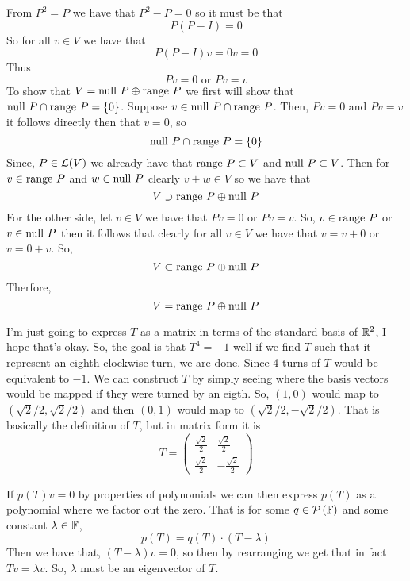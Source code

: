 \documentclass[10pt, twocolumn]{article}
\begin{document}
\begin{q}[4]
    From $ P^2 = P $ we have that $ P^2 - P = 0 $ so it must be that 
    $$ P(P - I) = 0 $$
    So for all $ v \in V $ we have that 
    $$ P(P - I)v = 0v = 0 $$
    Thus
    $$ Pv = 0 \text{ or } Pv = v $$
    To show that $ V = \text{null } P \oplus \text{range } P $ we first will show that $ \text{null } P \cap \text{range } P = \{0\} $.
    Suppose $ v \in \text{null } P \cap \text{range } P $. 
    Then, $ Pv = 0 $ and $ Pv = v $ it follows directly then that $ v = 0 $, so 
    $$ \text{null } P \cap \text{range } P = \{0\} $$
    Since, $ P \in \mathcal{L}(V) $ we already have that $ \text{range } P \subset V $ and $ \text{null } P \subset V $. 
    Then for $ v \in \text{range } P $ and $ w \in \text{null } P $ clearly $ v + w \in V $ so we have that 
    $$ V \supset \text{range } P \oplus \text{null } P $$
    For the other side, let $ v \in V $ we have that $ Pv = 0 $ or $ Pv = v $. 
    So, $ v \in \text{range } P $ or $ v \in \text{null } P $ then it follows that clearly for all $ v \in V $ we have that 
    $ v = v + 0 $ or $ v = 0 + v $. 
    So, 
    $$ V \subset \text{range } P \oplus \text{null } P $$
    Therfore,
    $$ V = \text{range } P \oplus \text{null } P $$
\end{q}
\begin{q}[8]
    I'm just going to express $ T $ as a matrix in terms of the standard basis of $ \mathbb{R}^2 $, I hope that's okay. 
    So, the goal is that $ T^4 = -1 $ well if we find $ T $ such that it represent an eighth clockwise turn, we are done. 
    Since 4 turns of $ T $ would be equivalent to $ - 1 $. 
    We can construct $ T $ by simply seeing where the basis vectors would be mapped if they were turned by an eigth. 
    So, $ (1, 0) $ would map to $ (\sqrt{2}/2, \sqrt{2}/2)$ and then $ (0, 1) $ would map to $ (\sqrt{2}/2, -\sqrt{2}/2)$. 
    That is basically the definition of $ T $, but in matrix form it is 
    $$ T = \begin{pmatrix}
        \frac{\sqrt{2}}{2} & \frac{\sqrt{2}}{2} \\
        \frac{\sqrt{2}}{2} & -\frac{\sqrt{2}}{2}
        \end{pmatrix} 
    $$
\end{q}
\begin{q}[9]
    If $ p(T)v = 0 $ by properties of polynomials we can then express $ p(T) $ as a polynomial where we factor out the zero. 
    That is for some $ q \in \mathcal{P}_{}\left(\mathbb{F}\right) $ and some constant $ \lambda \in \mathbb{F} $, 
    $$ p(T) = q(T) \cdot (T - \lambda) $$
    Then we have that, 
    $ (T - \lambda) v = 0 $, so then by rearranging we get that in fact $ Tv = \lambda v $. 
    So, $ \lambda $ must be an eigenvector of $ T $.
\end{q}
\end{document}
